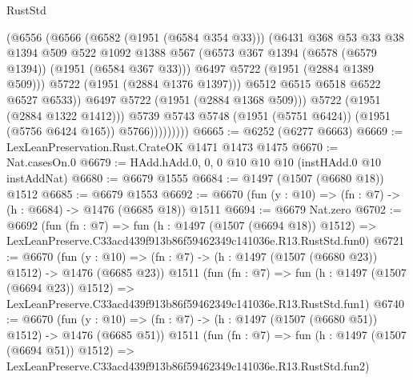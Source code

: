 \begin{lexlean}{RustStd}
\begin{coremodule}
                            (@6556
                              (@6566
                                (@6582 (@1951 (@6584 @354 @33)))
                                (@6431
                                  @368
                                  @53
                                  @33
                                  @38
                                  @1394
                                  @509
                                  @522
                                  @1092
                                  @1388
                                  @567
                                  (@6573 @367 @1394 (@6578 (@6579 @1394)) (@1951 (@6584 @367 @33)))
                                  @6497
                                  @5722
                                  (@1951 (@2884 @1389 @509)))
                                @5722
                                (@1951 (@2884 @1376 @1397)))
                              @6512
                              @6515
                              @6518
                              @6522
                              @6527
                              @6533))
                          @6497
                          @5722
                          (@1951 (@2884 @1368 @509)))
                        @5722
                        (@1951 (@2884 @1322 @1412)))
                      @5739
                      @5743
                      @5748
                      (@1951 (@5751 @6424))
                      (@1951 (@5756 @6424 @165))
                      @5766)))))))))
@6665 := @6252 (@6277 @6663)
@6669 := LexLeanPreservation.Rust.CrateOK @1471 @1473 @1475
@6670 := Nat.casesOn.{0}
@6679 := HAdd.hAdd.{0, 0, 0} @10 @10 @10 (instHAdd.{0} @10 instAddNat)
@6680 := @6679 @1555
@6684 := @1497 (@1507 (@6680 @18)) @1512
@6685 := @6679 @1553
@6692 := @6670 (fun (y : @10) => (fn : @7) -> (h : @6684) -> @1476 (@6685 @18)) @1511
@6694 := @6679 Nat.zero
@6702 := @6692
    (fun (fn : @7) =>
    fun (h : @1497 (@1507 (@6694 @18)) @1512) =>
    LexLeanPreserve.C33acd439f913b86f59462349c141036e.R13.RustStd.fun0)
@6721 := @6670
    (fun (y : @10) => (fn : @7) -> (h : @1497 (@1507 (@6680 @23)) @1512) -> @1476 (@6685 @23))
    @1511
    (fun (fn : @7) =>
    fun (h : @1497 (@1507 (@6694 @23)) @1512) =>
    LexLeanPreserve.C33acd439f913b86f59462349c141036e.R13.RustStd.fun1)
@6740 := @6670
    (fun (y : @10) => (fn : @7) -> (h : @1497 (@1507 (@6680 @51)) @1512) -> @1476 (@6685 @51))
    @1511
    (fun (fn : @7) =>
    fun (h : @1497 (@1507 (@6694 @51)) @1512) =>
    LexLeanPreserve.C33acd439f913b86f59462349c141036e.R13.RustStd.fun2)

\end{coremodule}
\end{lexlean}
